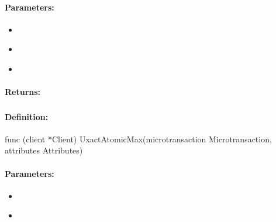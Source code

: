\paragraph{Parameters:}
\begin{itemize}[noitemsep]
\item {}\\

\item {}\\

\item {}\\

\end{itemize}

\paragraph{Returns:}


\pagebreak
\subsubsection{}
\label{api:Go:UxactAtomicMax}


\paragraph{Definition:}
\begin{gocode}
func (client *Client) UxactAtomicMax(microtransaction Microtransaction, attributes Attributes)
\end{gocode}

\paragraph{Parameters:}
\begin{itemize}[noitemsep]
\item {}\\

\item {}\\

\end{itemize}

